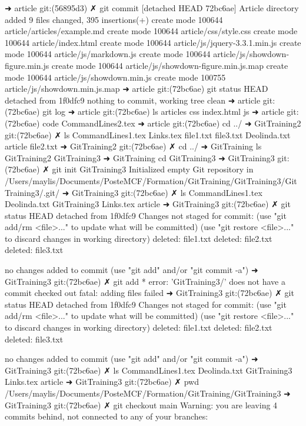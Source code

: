 ➜  article git:(56895d3) ✗ git commit
[detached HEAD 72bc6ae] Article directory added
 9 files changed, 395 insertions(+)
 create mode 100644 article/articles/example.md
 create mode 100644 article/css/style.css
 create mode 100644 article/index.html
 create mode 100644 article/js/jquery-3.3.1.min.js
 create mode 100644 article/js/markdown.js
 create mode 100644 article/js/showdown-figure.min.js
 create mode 100644 article/js/showdown-figure.min.js.map
 create mode 100644 article/js/showdown.min.js
 create mode 100755 article/js/showdown.min.js.map
➜  article git:(72bc6ae) git status
HEAD detached from 1f0dfc9
nothing to commit, working tree clean
➜  article git:(72bc6ae) git log
➜  article git:(72bc6ae) ls
articles   css        index.html js
➜  article git:(72bc6ae) code CommandLines2.tex
➜  article git:(72bc6ae) cd ../
➜  GitTraining2 git:(72bc6ae) ✗ ls
CommandLines1.tex Links.tex         file1.txt         file3.txt
Deolinda.txt      article           file2.txt
➜  GitTraining2 git:(72bc6ae) ✗ cd ../
➜  GitTraining ls
GitTraining2 GitTraining3
➜  GitTraining cd GitTraining3 
➜  GitTraining3 git:(72bc6ae) ✗ git init GitTraining3
Initialized empty Git repository in /Users/maylis/Documents/PosteMCF/Formation/GitTraining/GitTraining3/GitTraining3/.git/
➜  GitTraining3 git:(72bc6ae) ✗ ls
CommandLines1.tex Deolinda.txt      GitTraining3      Links.tex         article
➜  GitTraining3 git:(72bc6ae) ✗ git status
HEAD detached from 1f0dfc9
Changes not staged for commit:
  (use "git add/rm <file>..." to update what will be committed)
  (use "git restore <file>..." to discard changes in working directory)
	deleted:    file1.txt
	deleted:    file2.txt
	deleted:    file3.txt

no changes added to commit (use "git add" and/or "git commit -a")
➜  GitTraining3 git:(72bc6ae) ✗ git add *
error: 'GitTraining3/' does not have a commit checked out
fatal: adding files failed
➜  GitTraining3 git:(72bc6ae) ✗ git status
HEAD detached from 1f0dfc9
Changes not staged for commit:
  (use "git add/rm <file>..." to update what will be committed)
  (use "git restore <file>..." to discard changes in working directory)
	deleted:    file1.txt
	deleted:    file2.txt
	deleted:    file3.txt

no changes added to commit (use "git add" and/or "git commit -a")
➜  GitTraining3 git:(72bc6ae) ✗ ls
CommandLines1.tex Deolinda.txt      GitTraining3      Links.tex         article
➜  GitTraining3 git:(72bc6ae) ✗ pwd
/Users/maylis/Documents/PosteMCF/Formation/GitTraining/GitTraining3
➜  GitTraining3 git:(72bc6ae) ✗ git checkout main
Warning: you are leaving 4 commits behind, not connected to
any of your branches:

